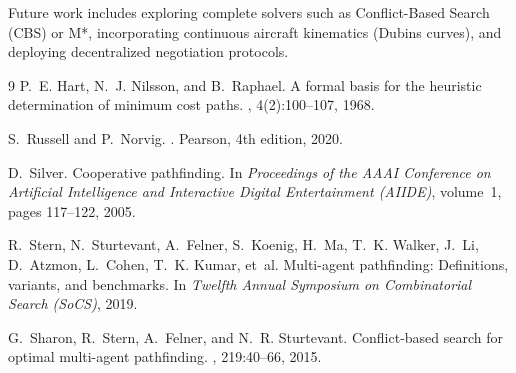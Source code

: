 \documentclass[11pt,a4paper]{article}
\begin{document}
Future work includes exploring complete solvers such as Conflict-Based Search (CBS) \cite{sharon2015} or M*, incorporating continuous aircraft kinematics (Dubins curves), and deploying decentralized negotiation protocols.

\begin{thebibliography}{9}
P.~E. Hart, N.~J. Nilsson, and B.~Raphael.
\newblock A formal basis for the heuristic determination of minimum cost paths.
, 4(2):100--107, 1968.

S.~Russell and P.~Norvig.
.
\newblock Pearson, 4th edition, 2020.

D.~Silver.
\newblock Cooperative pathfinding.
\newblock In {\em Proceedings of the AAAI Conference on Artificial Intelligence and Interactive Digital Entertainment (AIIDE)}, volume~1, pages 117--122, 2005.

R.~Stern, N.~Sturtevant, A.~Felner, S.~Koenig, H.~Ma, T.~K. Walker, J.~Li, D.~Atzmon, L.~Cohen, T.~K. Kumar, et~al.
\newblock Multi-agent pathfinding: Definitions, variants, and benchmarks.
\newblock In {\em Twelfth Annual Symposium on Combinatorial Search (SoCS)}, 2019.

G.~Sharon, R.~Stern, A.~Felner, and N.~R. Sturtevant.
\newblock Conflict-based search for optimal multi-agent pathfinding.
, 219:40--66, 2015.
\end{thebibliography}
\end{document}
